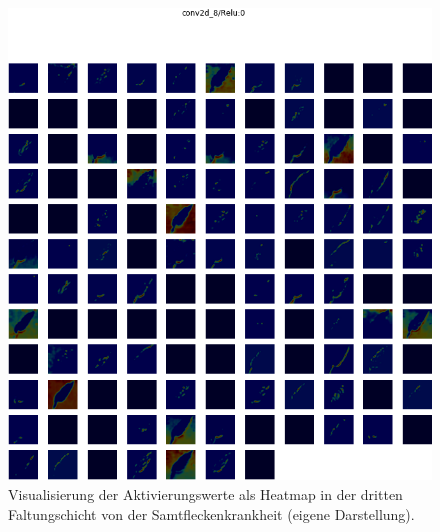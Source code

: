 \begin{figure}[h!]
	\centering
	\includegraphics[width=\textwidth]{visualisierungen/leaf_mold/heatmap_mit/conv2d_8.png}
	\caption{Visualisierung der Aktivierungswerte als Heatmap in der dritten Faltungschicht von der Samtfleckenkrankheit (eigene Darstellung).}
	\label{}
\end{figure}

